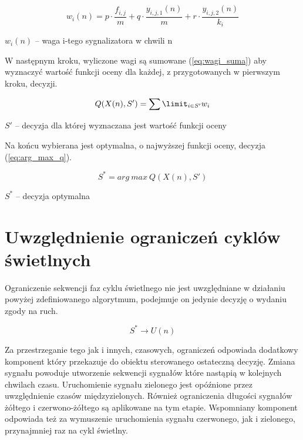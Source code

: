 \begin{equation}
\label{eq:wagi}
	w_{i} (n) = p \cdot \frac{f_{i, j}}{m} + q \cdot \frac{y_{i, j, 1} (n)}{m} + r \cdot \frac{y_{i, j, 2} (n)}{k_{i}}
\end{equation}

\begin{math} w_{i} (n) \end{math} \textrm{ -- waga i-tego sygnalizatora w chwili n}

\vspace{0.5cm}
W następnym kroku, wyliczone wagi są sumowane (\ref{eq:wagi_suma}) aby wyznaczyć wartość funkcji oceny dla każdej, z przygotowanych w pierwszym kroku, decyzji.

\begin{equation}
\label{eq:wagi_suma}
	Q (X(n), S') = \sum\limit_{i \in S'} w_{i}
\end{equation}

\begin{math} S' \end{math} \textrm{ -- decyzja dla której wyznaczana jest wartość funkcji oceny}

\vspace{0.5cm}
Na końcu wybierana jest optymalna, o najwyższej funkcji oceny, decyzja (\ref{eq:arg_max_q}).

\begin{equation}
\label{eq:arg_max_q}
	S^{*} = arg\:max\:Q (X(n), S')
\end{equation}

\begin{math} S^{*} \end{math} \textrm{ -- decyzja optymalna}

\section{Uwzględnienie ograniczeń cyklów świetlnych}
Ograniczenie sekwencji faz cyklu świetlnego nie jest uwzględniane w działaniu powyżej zdefiniowanego algorytmum, podejmuje on jedynie decyzję o wydaniu zgody na ruch.

\begin{equation}
	S^{*} \to U(n)
\end{equation}

Za przestrzeganie tego jak i innych, czasowych, ograniczeń odpowiada dodatkowy komponent który przekazuje do obiektu sterowanego ostateczną decyzję. Zmiana sygnału powoduje utworzenie sekwencji sygnałów które nastąpią w kolejnych chwilach czasu. Uruchomienie sygnału zielonego jest opóźnione przez uwzględnienie czasów międzyzielonych. Również ograniczenia długości sygnałów żółtego i czerwono-żółtego są aplikowane na tym etapie. Wspomniany komponent odpowiada też za wymuszenie uruchomienia sygnału czerwonego, jak i zielonego, przynajmniej raz na cykl świetlny.

